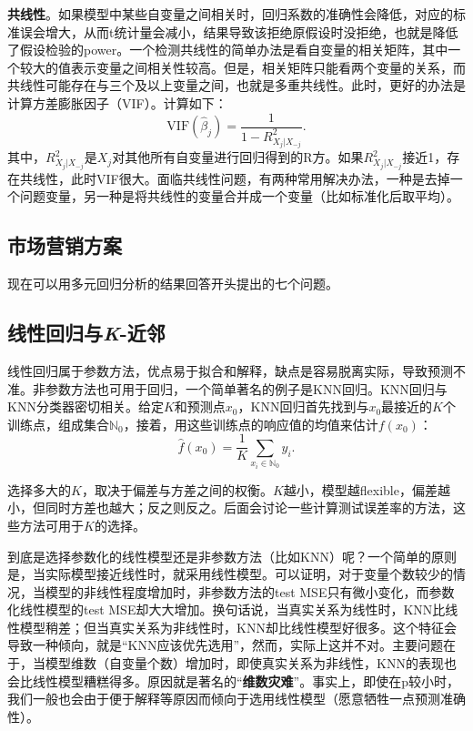 \documentclass[hyperref,]{ctexart}
\begin{document}
\textbf{共线性}。如果模型中某些自变量之间相关时，回归系数的准确性会降低，对应的标准误会增大，从而t统计量会减小，结果导致该拒绝原假设时没拒绝，也就是降低了假设检验的power。一个检测共线性的简单办法是看自变量的相关矩阵，其中一个较大的值表示变量之间相关性较高。但是，相关矩阵只能看两个变量的关系，而共线性可能存在与三个及以上变量之间，也就是多重共线性。此时，更好的办法是计算方差膨胀因子（VIF）。计算如下：
\[\mathrm{VIF}(\hat{\beta}_j) = \frac{1}{1-R^2_{X_j|X_{-j}}}.\]
其中，\(R^2_{X_j|X_{-j}}\)是\(X_j\)对其他所有自变量进行回归得到的R方。如果\(R^2_{X_j|X_{-j}}\)接近1，存在共线性，此时VIF很大。面临共线性问题，有两种常用解决办法，一种是去掉一个问题变量，另一种是将共线性的变量合并成一个变量（比如标准化后取平均）。

\subsection{市场营销方案}

现在可以用多元回归分析的结果回答开头提出的七个问题。

\subsection{\texorpdfstring{线性回归与\emph{K}-近邻}{线性回归与K-近邻}}\label{k-}

线性回归属于参数方法，优点易于拟合和解释，缺点是容易脱离实际，导致预测不准。非参数方法也可用于回归，一个简单著名的例子是KNN回归。KNN回归与KNN分类器密切相关。给定\(K\)和预测点\(x_0\)，KNN回归首先找到与\(x_0\)最接近的\(K\)个训练点，组成集合\(\mathbb{N}_0\)，接着，用这些训练点的响应值的均值来估计\(f(x_0)\)：
\[\hat{f}(x_0) = \frac{1}{K}\sum_{x_i\in \mathbb{N}_0} y_i.\]

选择多大的\(K\)，取决于偏差与方差之间的权衡。\(K\)越小，模型越flexible，偏差越小，但同时方差也越大；反之则反之。后面会讨论一些计算测试误差率的方法，这些方法可用于\(K\)的选择。

到底是选择参数化的线性模型还是非参数方法（比如KNN）呢？一个简单的原则是，当实际模型接近线性时，就采用线性模型。可以证明，对于变量个数较少的情况，当模型的非线性程度增加时，非参数方法的test
MSE只有微小变化，而参数化线性模型的test
MSE却大大增加。换句话说，当真实关系为线性时，KNN比线性模型稍差；但当真实关系为非线性时，KNN却比线性模型好很多。这个特征会导致一种倾向，就是``KNN应该优先选用''，然而，实际上这并不对。主要问题在于，当模型维数（自变量个数）增加时，即使真实关系为非线性，KNN的表现也会比线性模型糟糕得多。原因就是著名的``\textbf{维数灾难}''。事实上，即使在p较小时，我们一般也会由于便于解释等原因而倾向于选用线性模型（愿意牺牲一点预测准确性）。
\end{document}
